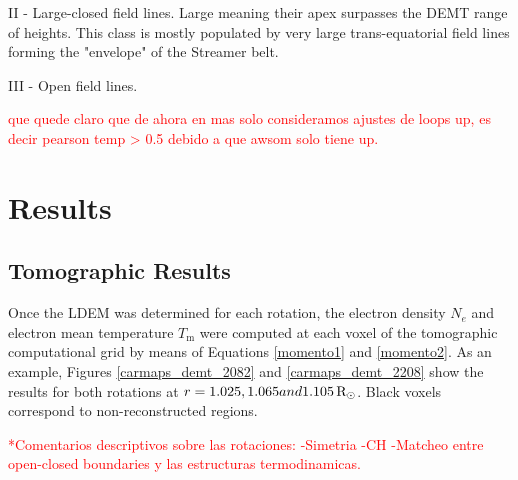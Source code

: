 \documentclass[namedreferences]{solarphysics}
\newcommand{\mrsun}{{\rm R_\odot}}
\begin{document}
\begin{article}
  II - Large-closed field lines. Large meaning their apex surpasses the DEMT range of heights. This class is mostly populated by very large trans-equatorial field lines forming the "envelope" of the Streamer belt.

 III - Open field lines.

\textcolor{red}{que quede claro que de ahora en mas solo consideramos ajustes de loops up, es decir pearson temp > 0.5 debido a que awsom solo tiene up.}


\section{Results}\label{resu} 

\subsection{Tomographic Results}\label{demt_res} 

Once the LDEM was determined for each rotation, the electron density $N_e$ and electron mean temperature $T_\textrm{m}$ were computed at each voxel of the tomographic computational grid by means of Equations \ref{momento1} and \ref{momento2}. As an example, Figures \ref{carmaps_demt_2082} and \ref{carmaps_demt_2208} show the results for both rotations at $r=1.025, 1.065 and 1.105\,\mrsun$. Black voxels correspond to non-reconstructed regions.

\textcolor{red}{
*Comentarios descriptivos sobre las rotaciones:
-Simetria
-CH
-Matcheo entre open-closed boundaries y las estructuras termodinamicas.
}



\end{article}
\end{document}

